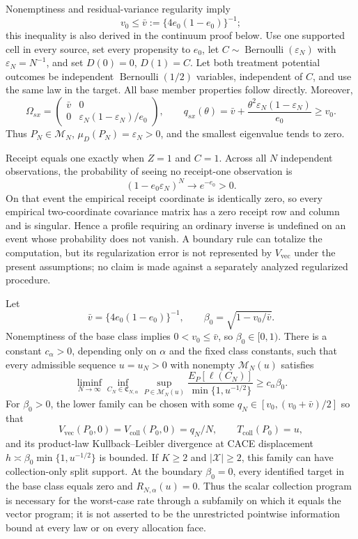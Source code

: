 Nonemptiness and residual-variance regularity imply
\[
v_0\le \bar v:=\{4e_0(1-e_0)\}^{-1};
\]
this inequality is also derived in the continuum proof below. Use one supported cell in every source, set every propensity to \(e_0\), let \(C\sim\operatorname{Bernoulli}(\varepsilon_N)\) with \(\varepsilon_N=N^{-1}\), and set \(D(0)=0\), \(D(1)=C\). Let both treatment potential outcomes be independent \(\operatorname{Bernoulli}(1/2)\) variables, independent of \(C\), and use the same law in the target. All base member properties follow directly. Moreover,
\[
\Omega_{sx}=
\begin{pmatrix}
\bar v&0\\[2pt]
0&\varepsilon_N(1-\varepsilon_N)/e_0
\end{pmatrix},
\qquad
q_{sx}(\theta)=\bar v+\frac{\theta^2\varepsilon_N(1-\varepsilon_N)}{e_0}\ge v_0.
\]
Thus \(P_N\in\mathcal M_N\), \(\mu_D(P_N)=\varepsilon_N>0\), and the smallest eigenvalue tends to zero.

Receipt equals one exactly when \(Z=1\) and \(C=1\). Across all \(N\) independent observations, the probability of seeing no receipt-one observation is
\[
(1-e_0\varepsilon_N)^N\longrightarrow e^{-e_0}>0.
\]
On that event the empirical receipt coordinate is identically zero, so every empirical two-coordinate covariance matrix has a zero receipt row and column and is singular. Hence a profile requiring an ordinary inverse is undefined on an event whose probability does not vanish. A boundary rule can totalize the computation, but its regularization error is not represented by \(V_{\mathrm{vec}}\) under the present assumptions; no claim is made against a separately analyzed regularized procedure.

Let
\[
\bar v=\{4e_0(1-e_0)\}^{-1},
\qquad
\beta_0=\sqrt{1-v_0/\bar v}.
\]
Nonemptiness of the base class implies \(0<v_0\le\bar v\), so \(\beta_0\in[0,1)\). There is a constant \(c_\alpha>0\), depending only on \(\alpha\) and the fixed class constants, such that every admissible sequence \(u=u_N>0\) with nonempty \(\mathcal M_N(u)\) satisfies
\[
\liminf_{N\to\infty}
\inf_{C_N\in\mathfrak C_{N,\alpha}}
\sup_{P\in\mathcal M_N(u)}
\frac{E_P[\ell(C_N)]}{\min\{1,u^{-1/2}\}}
\ge c_\alpha\beta_0.
\]
For \(\beta_0>0\), the lower family can be chosen with some \(q_N\in[v_0,(v_0+\bar v)/2]\) so that
\[
V_{\mathrm{vec}}(P_0,0)=V_{\mathrm{coll}}(P_0,0)=q_N/N,
\qquad T_{\mathrm{coll}}(P_0)=u,
\]
and its product-law Kullback--Leibler divergence at CACE displacement \(h\asymp\beta_0\min\{1,u^{-1/2}\}\) is bounded. If \(K\ge2\) and \(|\mathcal X|\ge2\), this family can have collection-only split support. At the boundary \(\beta_0=0\), every identified target in the base class equals zero and \(R_{N,\alpha}(u)=0\). Thus the scalar collection program is necessary for the worst-case rate through a subfamily on which it equals the vector program; it is not asserted to be the unrestricted pointwise information bound at every law or on every allocation face.

